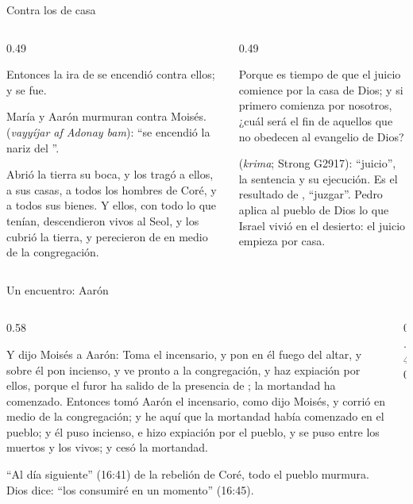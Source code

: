 \begin{frame}{Contra los de casa}
\begin{columns}[t,onlytextwidth]
\begin{column}{0.49\textwidth}
\begin{cita}Entonces la ira de \SENOR{} se encendió contra ellos; y se fue.\end{cita}
\scriptsize María y Aarón murmuran contra Moisés.  (\emph{vayyíjar af Adonay bam}): ``se encendió la nariz del \SENOR''.
\begin{cita}Abrió la tierra su boca, y los tragó a ellos, a sus casas, a todos los hombres de Coré, y a todos sus bienes. Y ellos, con todo lo que tenían, descendieron vivos al Seol, y los cubrió la tierra, y perecieron de en medio de la congregación.\end{cita}
\end{column}
\begin{column}{0.49\textwidth}
\begin{cita}Porque es tiempo de que el juicio comience por la casa de Dios; y si primero comienza por nosotros, ¿cuál será el fin de aquellos que no obedecen al evangelio de Dios?\end{cita}
\scriptsize{} (\emph{krima}; Strong G2917): ``juicio'', la sentencia y su ejecución. Es el resultado de , ``juzgar''. Pedro aplica al pueblo de Dios lo que Israel vivió en el desierto: el juicio empieza por casa.\par\smallskip
{}
\end{column}
\end{columns}
\end{frame}

\begin{frame}{Un encuentro: Aarón}
\begin{columns}[c,onlytextwidth]
\begin{column}{0.58\textwidth}
\begin{cita}Y dijo Moisés a Aarón: Toma el incensario, y pon en él fuego del altar, y sobre él pon incienso, y ve pronto a la congregación, y haz expiación por ellos, porque el furor ha salido de la presencia de \SENOR; la mortandad ha comenzado. Entonces tomó Aarón el incensario, como dijo Moisés, y corrió en medio de la congregación; y he aquí que la mortandad había comenzado en el pueblo; y él puso incienso, e hizo expiación por el pueblo, y se puso entre los muertos y los vivos; y cesó la mortandad.\end{cita}
\scriptsize ``Al día siguiente'' (16:41) de la rebelión de Coré, todo el pueblo murmura. Dios dice: ``los consumiré en un momento'' (16:45).
\end{column}
\begin{column}{0.40\textwidth}\end{column}
\end{columns}
\end{frame}

